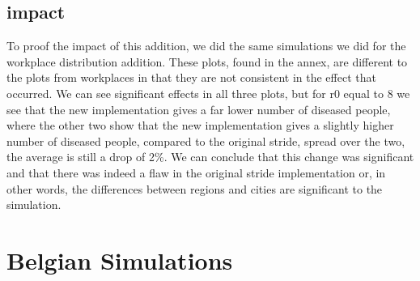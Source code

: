 \documentclass[runningheads]{llncs}
\begin{document}
	\subsection{impact}
	To proof the impact of this addition, we did the same simulations we did for the workplace distribution addition. These plots, found in the annex, are different to the plots from workplaces in that they are not consistent in the effect that occurred. We can see significant effects in all three plots, but for r0 equal to 8 we see that the new implementation gives a far lower number of diseased people, where the other two show that the new implementation gives a slightly higher number of diseased people, compared to the original stride, spread over the two, the average is still a drop of 2\%. We can conclude that this change was significant and that there was indeed a flaw in the original stride implementation or, in other words, the differences between regions and cities are significant to the simulation.
	\section{Belgian Simulations}
	
	\newpage
	\appendix
	\appendixpage
\end{document}
